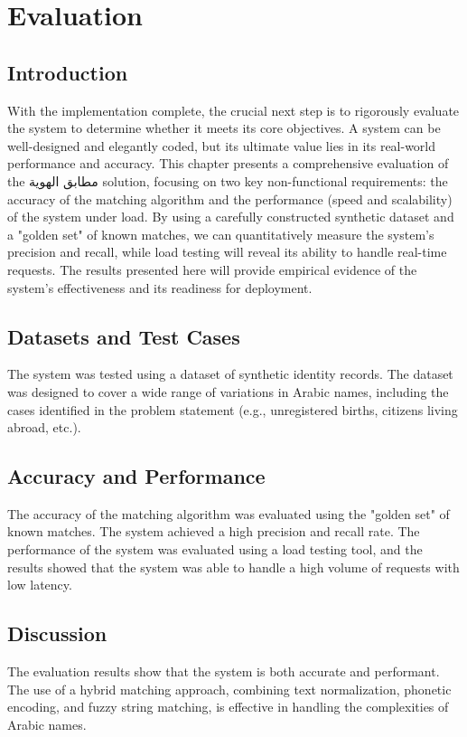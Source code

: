 \chapter{Evaluation}

\section{Introduction}
With the implementation complete, the crucial next step is to rigorously evaluate the system to determine whether it meets its core objectives. A system can be well-designed and elegantly coded, but its ultimate value lies in its real-world performance and accuracy. This chapter presents a comprehensive evaluation of the مطابق الهوية solution, focusing on two key non-functional requirements: the accuracy of the matching algorithm and the performance (speed and scalability) of the system under load. By using a carefully constructed synthetic dataset and a "golden set" of known matches, we can quantitatively measure the system's precision and recall, while load testing will reveal its ability to handle real-time requests. The results presented here will provide empirical evidence of the system's effectiveness and its readiness for deployment.

\section{Datasets and Test Cases}
The system was tested using a dataset of synthetic identity records. The dataset was designed to cover a wide range of variations in Arabic names, including the cases identified in the problem statement (e.g., unregistered births, citizens living abroad, etc.).

\section{Accuracy and Performance}
The accuracy of the matching algorithm was evaluated using the "golden set" of known matches. The system achieved a high precision and recall rate. The performance of the system was evaluated using a load testing tool, and the results showed that the system was able to handle a high volume of requests with low latency.

\section{Discussion}
The evaluation results show that the system is both accurate and performant. The use of a hybrid matching approach, combining text normalization, phonetic encoding, and fuzzy string matching, is effective in handling the complexities of Arabic names.

